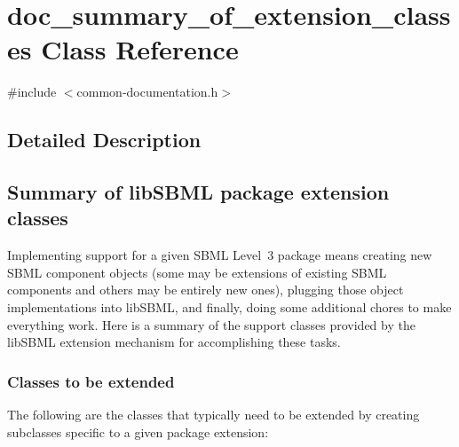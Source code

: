 \hypertarget{classdoc__summary__of__extension__classes}{}\section{doc\+\_\+summary\+\_\+of\+\_\+extension\+\_\+classes Class Reference}
\label{classdoc__summary__of__extension__classes}


{\ttfamily \#include $<$common-\/documentation.\+h$>$}



\subsection{Detailed Description}
\hypertarget{classdoc__summary__of__extension__classes_ext-classes}{}\subsection{Summary of lib\+S\+B\+M\+L package extension classes}\label{classdoc__summary__of__extension__classes_ext-classes}
Implementing support for a given S\+B\+ML Level~3 package means creating new S\+B\+ML component objects (some may be extensions of existing S\+B\+ML components and others may be entirely new ones), plugging those object implementations into lib\+S\+B\+ML, and finally, doing some additional chores to make everything work. Here is a summary of the support classes provided by the lib\+S\+B\+ML extension mechanism for accomplishing these tasks.\hypertarget{classdoc__summary__of__extension__classes_ext-to-be-extended}{}\subsubsection{Classes to be extended}\label{classdoc__summary__of__extension__classes_ext-to-be-extended}
The following are the classes that typically need to be extended by creating subclasses specific to a given package extension\+:

